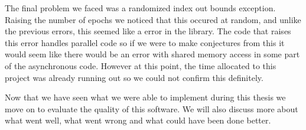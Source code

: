 The final problem we faced was a randomized index out bounds exception.
Raising the number of epochs we noticed that this occured at random, and unlike the previous errors, this seemed like a error in the library.
The code that raises this error handles parallel code so if we were to make conjectures from this it would seem like there would be an error with shared memory access in some part of the asynchronous code.
However at this point, the time allocated to this project was already running out so we could not confirm this definitely.

Now that we have seen what we were able to implement during this thesis we move on to evaluate the quality of this software.
We will also discuss more about what went well, what went wrong and what could have been done better.